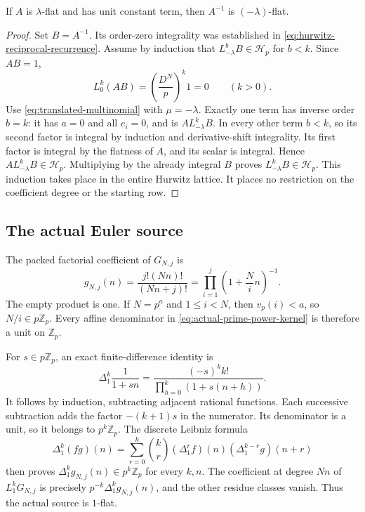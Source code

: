 \begin{lemma}
\label{lem:translated-hurwitz-inverse}
If $A$ is $\lambda$-flat and has unit constant term, then $A^{-1}$ is
$(-\lambda)$-flat.
\end{lemma}

\begin{proof}
Set $B=A^{-1}$. Its order-zero integrality was established in
\eqref{eq:hurwitz-reciprocal-recurrence}. Assume by induction that
$L_{-\lambda}^bB\in\mathcal H_p$ for $b<k$. Since $AB=1$,
\[
 L_0^k(AB)=\left(\frac{D^N}{p}\right)^k1=0\qquad(k>0).
\]
Use \eqref{eq:translated-multinomial} with $\mu=-\lambda$.
Exactly one term has inverse order $b=k$: it has $a=0$ and all $e_i=0$,
and is $A L_{-\lambda}^k B$. In every other term $b<k$, so its second
factor is integral by induction and derivative-shift integrality. Its
first factor is integral by the flatness of $A$, and its scalar is
integral. Hence $A L_{-\lambda}^k B\in\mathcal H_p$. Multiplying by the
already integral $B$ proves $L_{-\lambda}^k B\in\mathcal H_p$.
This induction takes place in the entire Hurwitz lattice. It places no
restriction on the coefficient degree or the starting row.
\end{proof}

\subsection{The actual Euler source}

The packed factorial coefficient of $G_{N,j}$ is
\begin{equation}
 g_{N,j}(n)=\frac{j!(Nn)!}{(Nn+j)!}
   =\prod_{i=1}^j\left(1+\frac Ni n\right)^{-1}.
 \label{eq:actual-prime-power-kernel}
\end{equation}
The empty product is one. If $N=p^a$ and $1\leq i<N$, then
$v_p(i)<a$, so $N/i\in p\mathbb Z_p$. Every affine denominator in
\eqref{eq:actual-prime-power-kernel} is therefore a unit on $\mathbb Z_p$.

For $s\in p\mathbb Z_p$, an exact finite-difference identity is
\begin{equation}
 \Delta_1^k\frac1{1+sn}
  =\frac{(-s)^k k!}{\prod_{h=0}^k(1+s(n+h))}.
 \label{eq:affine-reciprocal-exact}
\end{equation}
It follows by induction, subtracting adjacent rational functions. Each
successive subtraction adds the factor $-(k+1)s$ in the numerator.
Its denominator is a unit, so it belongs to $p^k\mathbb Z_p$.
The discrete Leibniz formula
\begin{equation}
 \Delta_1^k(fg)(n)
 =\sum_{r=0}^k\binom kr
       (\Delta_1^r f)(n)(\Delta_1^{k-r}g)(n+r)
 \label{eq:discrete-leibniz-final}
\end{equation}
then proves $\Delta_1^k g_{N,j}(n)\in p^k\mathbb Z_p$ for every $k,n$.
The coefficient at degree $Nn$ of $L_1^kG_{N,j}$ is precisely
$p^{-k}\Delta_1^k g_{N,j}(n)$, and the other residue classes vanish.
Thus the actual source is $1$-flat.

